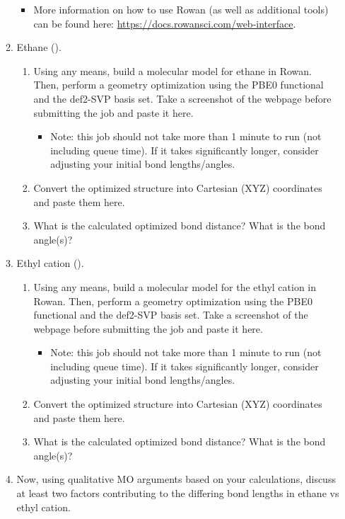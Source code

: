\documentclass[../psets.tex]{subfiles}
\begin{document}
\begin{enumerate}
\begin{enumerate}
\begin{itemize}
            \item More information on how to use Rowan (as well as additional tools) can be found here: \url{https://docs.rowansci.com/web-interface}.
        \end{itemize}
        \item Ethane ().
        \begin{enumerate}
            \item Using any means, build a molecular model for ethane in Rowan. Then, perform a geometry optimization using the PBE0 functional and the def2-SVP basis set. Take a screenshot of the webpage before submitting the job and paste it here.
            \begin{itemize}
                \item Note: this job should not take more than 1 minute to run (not including queue time). If it takes significantly longer, consider adjusting your initial bond lengths/angles.
            \end{itemize}
            \item Convert the optimized structure into Cartesian (XYZ) coordinates and paste them here.
            \item What is the calculated optimized  bond distance? What is the  bond angle(s)?
        \end{enumerate}
        \item Ethyl cation ().
        \begin{enumerate}
            \item Using any means, build a molecular model for the ethyl cation in Rowan. Then, perform a geometry optimization using the PBE0 functional and the def2-SVP basis set. Take a screenshot of the webpage before submitting the job and paste it here.
            \begin{itemize}
                \item Note: this job should not take more than 1 minute to run (not including queue time). If it takes significantly longer, consider adjusting your initial bond lengths/angles.
            \end{itemize}
            \item Convert the optimized structure into Cartesian (XYZ) coordinates and paste them here.
            \item What is the calculated optimized  bond distance? What is the  bond angle(s)?
        \end{enumerate}
        \item Now, using qualitative MO arguments based on your calculations, discuss at least two factors contributing to the differing  bond lengths in ethane vs ethyl cation.
    \end{enumerate}
\end{enumerate}
\end{document}
